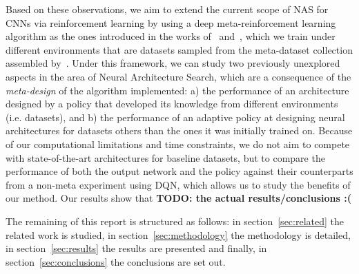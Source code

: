 Based on these observations, we aim to extend the current scope of NAS for CNNs via reinforcement learning by using a deep meta-reinforcement learning algorithm as the ones introduced in the works of~\citet{LtRL} and~\citet{RL2}, which we train under different environments that are datasets sampled from the meta-dataset collection assembled by~\citet{MetaDataset}. Under this framework, we can study two previously unexplored aspects in the area of Neural Architecture Search, which are a consequence of the \textit{meta-design} of the algorithm implemented: a) the performance of an architecture designed by a policy that developed its knowledge from different environments (i.e. datasets), and b) the performance of an adaptive policy %
at designing neural architectures for datasets others than the ones it was initially trained on. Because of our computational limitations and time constraints, we do not aim to compete with state-of-the-art architectures for baseline datasets, %
but to compare the performance of both the output network and the policy against their counterparts from a non-meta experiment using \textsc{DQN}, which allows us to study the benefits of our method. Our results show that \textbf{TODO: the actual results/conclusions :(}


The remaining of this report is structured as follows: in section~\ref{sec:related} the related work is studied, in section~\ref{sec:methodology} the methodology is detailed, in section~\ref{sec:results} the results are presented and finally, in section~\ref{sec:conclusions} the conclusions are set out. %




